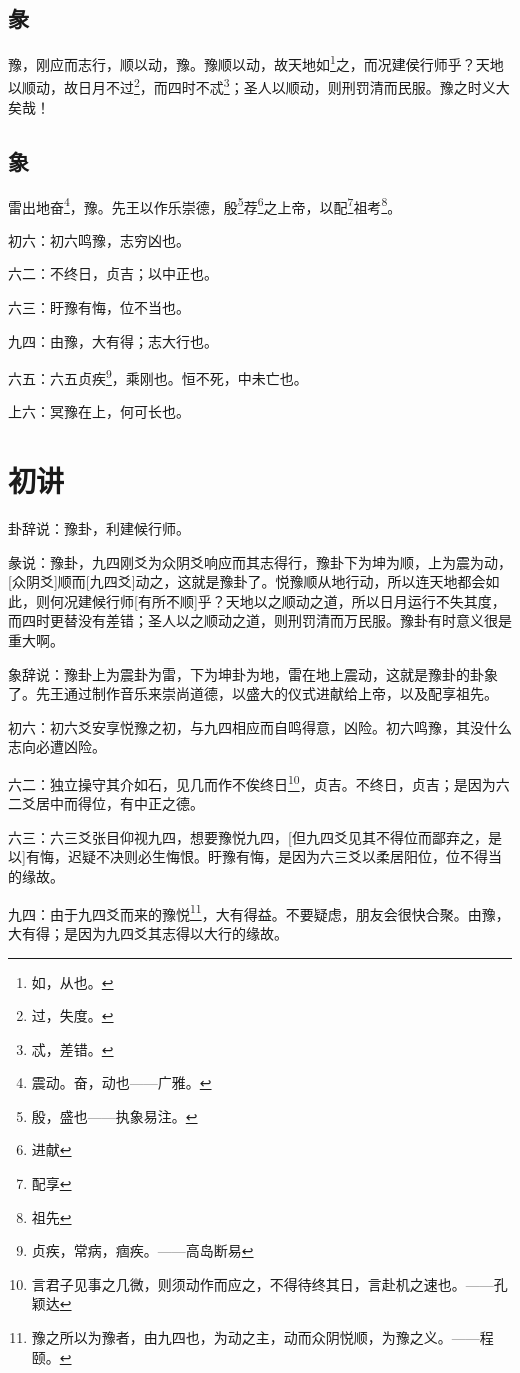 \documentclass[12pt,oneside]{book}
\begin{document}
\subsection{彖}
豫，刚应而志行，顺以动，豫。豫顺以动，故天地如\footnote{如，从也。}之，而况建侯行师乎？天地以顺动，故日月不过\footnote{过，失度。}，而四时不忒\footnote{忒，差错。}；圣人以顺动，则刑罚清而民服。豫之时义大矣哉！

\subsection{象}
雷出地奋\footnote{震动。奋，动也——广雅。}，豫。先王以作乐崇德，殷\footnote{殷，盛也——执象易注。}荐\footnote{进献}之上帝，以配\footnote{配享}祖考\footnote{祖先}。

初六：初六鸣豫，志穷凶也。

六二：不终日，贞吉；以中正也。

六三：盱豫有悔，位不当也。

九四：由豫，大有得；志大行也。

六五：六五贞疾\footnote{贞疾，常病，痼疾。——高岛断易}，乘刚也。恒不死，中未亡也。

上六：冥豫在上，何可长也。

\section{初讲}
卦辞说：豫卦，利建候行师。

彖说：豫卦，九四刚爻为众阴爻响应而其志得行，豫卦下为坤为顺，上为震为动，[众阴爻]顺而[九四爻]动之，这就是豫卦了。悦豫顺从地行动，所以连天地都会如此，则何况建候行师[有所不顺]乎？天地以之顺动之道，所以日月运行不失其度，而四时更替没有差错；圣人以之顺动之道，则刑罚清而万民服。豫卦有时意义很是重大啊。

象辞说：豫卦上为震卦为雷，下为坤卦为地，雷在地上震动，这就是豫卦的卦象了。先王通过制作音乐来崇尚道德，以盛大的仪式进献给上帝，以及配享祖先。

初六：初六爻安享悦豫之初，与九四相应而自鸣得意，凶险。初六鸣豫，其没什么志向必遭凶险。

六二：独立操守其介如石，见几而作不俟终日\footnote{言君子见事之几微，则须动作而应之，不得待终其日，言赴机之速也。——孔颖达}，贞吉。不终日，贞吉；是因为六二爻居中而得位，有中正之德。

六三：六三爻张目仰视九四，想要豫悦九四，[但九四爻见其不得位而鄙弃之，是以]有悔，迟疑不决则必生悔恨。盱豫有悔，是因为六三爻以柔居阳位，位不得当的缘故。

九四：由于九四爻而来的豫悦\footnote{豫之所以为豫者，由九四也，为动之主，动而众阴悦顺，为豫之义。——程颐。}，大有得益。不要疑虑，朋友会很快合聚。由豫，大有得；是因为九四爻其志得以大行的缘故。
\end{document}
